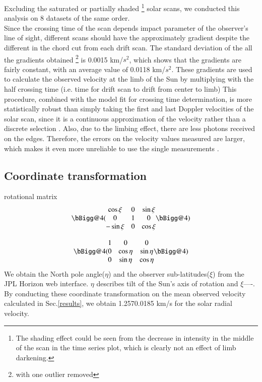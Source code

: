\documentclass[authoryear, 12pt,5p, times]{elsarticle}
\newcommand{\rpm}{\raisebox{.3ex}{$\scriptstyle\pm$}}
\begin{document}
\label{results}
Excluding the saturated or partially shaded \footnote{The shading effect could be seen from the decrease in intensity in the middle of the scan in the time series plot, which is clearly not an effect of limb darkening.} solar scans, we conducted this analysis on 8 datasets of the same order. 
\\
Since the crossing time of the scan depends impact parameter of the observer's line of sight, different scans should have the approximately gradient despite the different in the chord cut from  each drift scan. The standard deviation of the all the gradients obtained \footnote{with one outlier removed} is 0.0015 km/$s^2$, which shows that the gradients are fairly constant, with an average value of 0.0118 km/$s^2$. These gradients are used to calculate the observed velocity at the limb of the Sun by multiplying with the half crossing time (i.e. time for drift scan to drift from center to limb)
This procedure, combined with the model fit for crossing time determination, is more statistically robust than simply taking the first and last Doppler velocities of the solar scan, since it is a continuous approximation of the velocity rather than a discrete selection . Also, due to the limbing effect, there are less photons received on the edges. Therefore, the errors on the velocity values measured are larger, which makes it even more unreliable to use the single measurements .
\subsection{Coordinate transformation}
rotational matrix
\begin{equation}
\bBigg@{4}(\begin{matrix}
\cos\xi & 0 &\sin\xi \\ 
0 &1  &0 \\ 
-\sin\xi &0  &\cos\xi 
\end{matrix}\bBigg@{4})
\label{rotmatrix1}
\end{equation}

\begin{equation}
\bBigg@{4}(\begin{matrix}
1& 0 &0 \\ 
0 &\cos\eta  &\sin\eta \\ 
0 &\sin \eta  &\cos\eta 
\end{matrix}\bBigg@{4})
\label{rotmatrix2}
\end{equation}
We obtain the North pole angle($\eta$) and the observer sub-latitudes($\xi$) from the JPL Horizon web interface.
$\eta$ describes tilt of the Sun's axis of rotation and $\xi $----.
By conducting these coordinate transformation on the mean observed velocity calculated in Sec.\ref{results}, we obtain 1.257\rpm 0.0185 km/s for the solar radial velocity.
\end{document}
